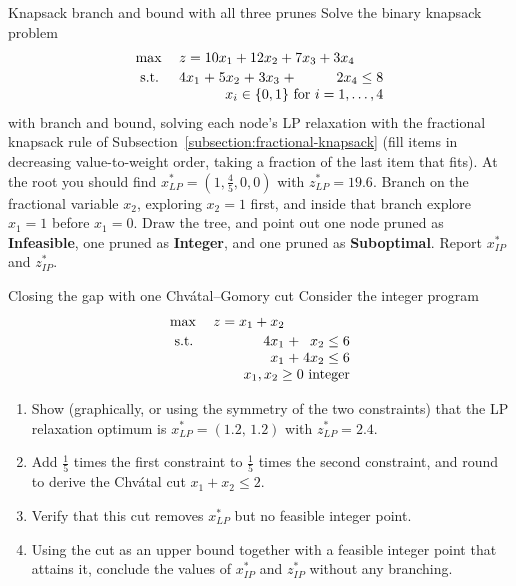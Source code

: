 \begin{ex}{Knapsack branch and bound with all three prunes}{}
\label{ex:ch13-knapsack-bb}
Solve the binary knapsack problem
\[
\begin{array}{l r@{\;}c@{\;}r@{\;}c@{\;}r@{\;}c@{\;}r@{\;}c@{\;}r}
\max & \multicolumn{7}{l}{z = 10x_1 + 12x_2 + 7x_3 + 3x_4} & & \\[2pt]
\st  & 4x_1 & + & 5x_2 & + & 3x_3 & + & 2x_4 & \leq & 8 \\
     & \multicolumn{9}{r}{x_i \in \{0,1\} \text{ for } i = 1,\dots,4}
\end{array}
\]
with branch and bound, solving each node's LP relaxation with the fractional
knapsack rule of Subsection~\ref{subsection:fractional-knapsack} (fill items
in decreasing value-to-weight order, taking a fraction of the last item that
fits).  At the root you should find $x^*_{LP} = (1, \tfrac45, 0, 0)$ with
$z^*_{LP} = 19.6$.  Branch on the fractional variable $x_2$, exploring
$x_2 = 1$ first, and inside that branch explore $x_1 = 1$ before $x_1 = 0$.
Draw the tree, and point out one node pruned as \textbf{Infeasible}, one
pruned as \textbf{Integer}, and one pruned as \textbf{Suboptimal}.  Report
$x^*_{IP}$ and $z^*_{IP}$.
\exrefs{\S\ref{sec:branch-and-bound}; \S\ref{subsection:fractional-knapsack}}
\end{ex}

\begin{ex}{Closing the gap with one Chv\'atal--Gomory cut}{}
\label{ex:ch13-cg-multipliers}
Consider the integer program
\[
\begin{array}{l r@{\;}c@{\;}r@{\;}c@{\;}r}
\max & z = x_1 + x_2 & & & & \\[2pt]
\st  & 4x_1 & + & x_2  & \leq & 6 \\
     & x_1  & + & 4x_2 & \leq & 6 \\
     & \multicolumn{5}{r}{x_1, x_2 \geq 0 \text{ integer}}
\end{array}
\]
\begin{enumerate}
\item Show (graphically, or using the symmetry of the two constraints) that
the LP relaxation optimum is $x^*_{LP} = (1.2,\, 1.2)$ with
$z^*_{LP} = 2.4$.
\item Add $\tfrac15$ times the first constraint to $\tfrac15$ times the
second constraint, and round to derive the Chv\'atal cut
$x_1 + x_2 \leq 2$.
\item Verify that this cut removes $x^*_{LP}$ but no feasible integer point.
\item Using the cut as an upper bound together with a feasible integer point
that attains it, conclude the values of $x^*_{IP}$ and $z^*_{IP}$ without any
branching.
\end{enumerate}
\exrefs{\S\ref{subsec:chvatal-cuts}; \S\ref{subsec:cutting-plane-procedure}}
\end{ex}

